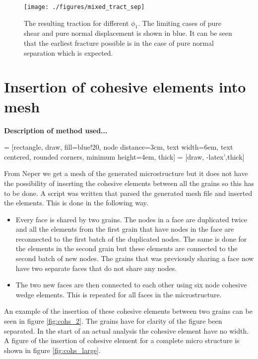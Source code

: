\documentclass[generate_interface_elements.tex]{subfiles}
\begin{document}
\begin{figure}[h]
\centering
  \texttt{[image: ./figures/mixed\_tract\_sep]}
\caption{The resulting traction for different $\phi_1$. The limiting cases of pure shear and pure normal displacement is shown in blue. It can be seen that the earliest fracture possible is in the case of pure normal separation which is expected. }
\label{fig:mixed_tract_sep}
\end{figure}



\section{Insertion of cohesive elements into mesh}

\textbf{Description of method used...}

 = [rectangle, draw, fill=blue!20, node distance=3cm, text width=6em, text centered, rounded corners, minimum height=4em, thick]
 = [draw, -latex',thick]



From Neper we get a mesh of the generated microstructure but it does not have the possibility of inserting the cohesive elements between all the grains so this has to be done. A script was written that parsed the generated mesh file and inserted the elements. This is done in the following way. 
%
\begin{itemize}
\item Every face is shared by two grains. The nodes in a face are duplicated twice and all the elements from the first grain that have nodes in the face are reconnected to the first batch of the duplicated nodes.  The same is done for the elements in the second grain but these elements are connected to the second batch of new nodes. The grains that was previously sharing a face now have two separate faces that do not share any nodes.
\item The two new faces are then connected to each other using six node cohesive wedge elements. This is repeated for all faces in the microstructure. 
\end{itemize}
%
An example of the insertion of these cohesive elements between two grains can be seen in figure \ref{fig:cohs_2}. The grains have for clarity of the figure been separated. In the start of an actual analysis the cohesive element have no width. A figure of the insertion of cohesive element for a complete micro structure is shown in figure \ref{fig:cohs_large}.
\end{document}
